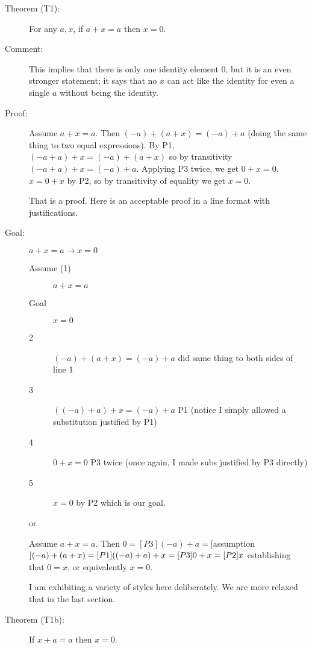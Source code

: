 \documentclass[12pt]{article}
\begin{document}
\begin{description}

\item[Theorem (T1):]  For any $a,x$, if $a+x=a$ then $x=0$.

\item[Comment:]  This implies that there is only one identity element 0, but it is an even stronger statement;
it says that no $x$ can act like the identity for even a single $a$ without being the identity.

\item[Proof:]   Assume $a+x=a$.  Then $(-a)+(a+x) = (-a)+a$ (doing the same thing to two equal expressions).
By P1, $(-a+a)+x = (-a)+(a+x)$ so by transitivity $(-a + a) + x = (-a)+a$.  Applying P3 twice, we get $0+x=0$.
$x=0+x$ by P2, so by transitivity of equality we get $x=0$.

That is a proof.  Here is an acceptable proof in a line format with justifications.

\item[Goal:]  $a+x=a\rightarrow x=0$

\begin{description}

\item[Assume (1)]  $a+x=a$

\item[Goal]  $x=0$

\item[2]  $(-a)+(a+x) = (-a)+a$  did same thing to both sides of line 1

\item[3]  $((-a)+a)+x = (-a)+a$  P1  (notice I simply allowed a substitution justified by P1)

\item[4]  $0+x=0$  P3 twice (once again, I made subs justified by P3 directly)

\item[5]  $x=0$ by P2  which is our goal.


\end{description}

or

Assume $a+x=a$.  Then $0 =[P3] (-a)+a =[$assumption$]\newline(-a)+(a+x)=[P1]((-a)+a)+x=[P3]0+x=[P2]x$ establishing that $0=x$, or equivalently $x=0$.

I am exhibiting a variety of styles here deliberately.  We are more relaxed that in the last section.

\item[Theorem (T1b):]  If $x+a=a$ then $x=0$.


\end{description}
\end{document}
